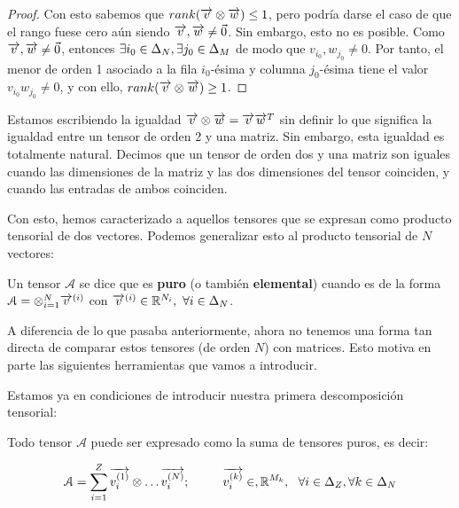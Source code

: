 \begin{proof}
Con esto sabemos que $rank(\overrightarrow{v} \otimes \overrightarrow{w}) \leq 1$, pero podría darse el caso de que el rango fuese cero aún siendo $\overrightarrow{v}, \overrightarrow{w} \neq \vec{0}$. Sin embargo, esto no es posible. Como $\overrightarrow{v}, \overrightarrow{w} \neq \vec{0}$, entonces $\exists i_0 \in \Delta_{N}, \exists j_0 \in \Delta_{M}$ de modo que $v_{i_0}, w_{j_0} \neq 0$. Por tanto, el menor de orden 1 asociado a la fila $i_0$-ésima y columna $j_0$-ésima tiene el valor $v_{i_0} w_{j_0} \neq 0$, y con ello, $rank(\overrightarrow{v} \otimes \overrightarrow{w}) \geq 1$.

\end{proof}

\begin{observacion}
    Estamos escribiendo la igualdad $\overrightarrow{v} \otimes \overrightarrow{w} = \overrightarrow{v} \overrightarrow{w}^T$ sin definir lo que significa la igualdad entre un tensor de orden 2 y una matriz. Sin embargo, esta igualdad es totalmente natural. Decimos que un tensor de orden dos y una matriz son iguales cuando las dimensiones de la matriz y las dos dimensiones del tensor coinciden, y cuando las entradas de ambos coinciden.
\end{observacion}

Con esto, hemos caracterizado a aquellos tensores que se expresan como producto tensorial de dos vectores. Podemos generalizar esto al producto tensorial de $N$ vectores:

\begin{definicion}
    Un tensor $\mathcal{A}$ se dice que es \textbf{puro} (o también \textbf{elemental}) cuando es de la forma $\mathcal{A} = \otimes_{i = 1}^N \overrightarrow{v}^{(i)}$ con $\overrightarrow{v}^{(i)} \in \mathbb{R}^{N_i},\ \forall i \in \Delta_{N}$.
\end{definicion}

\begin{observacion}
    A diferencia de lo que pasaba anteriormente, ahora no tenemos una forma tan directa de comparar estos tensores (de orden $N$) con matrices. Esto motiva en parte las siguientes herramientas que vamos a introducir.
\end{observacion}

Estamos ya en condiciones de introducir nuestra primera descomposición tensorial:

\begin{proposicion}
    Todo tensor $\mathcal{A}$ puede ser expresado como la suma de tensores puros, es decir:

    \begin{equation} \label{eq:cp_decomp}
        \mathcal{A} = \sum_{i = 1}^Z \overrightarrow{v_i^{(1)}} \otimes \ldots \overrightarrow{v_i^{(N)}}; \qquad
        \ \  \overrightarrow{v_i^{(k)}} \in,\mathbb{R}^{M_k}, \ \  \forall i \in \Delta_{Z}, \forall k \in \Delta_{N}
    \end{equation}
\end{proposicion}

